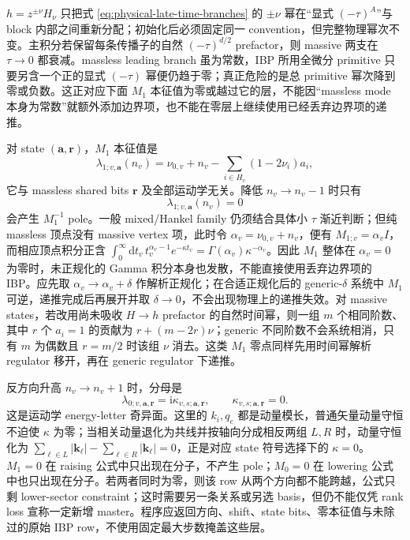 \documentclass[11pt,a4paper]{ctexart}
\newcommand{\dd}{\mathrm d}
\newcommand{\ii}{\mathrm i}
\begin{document}
$h=z^{\pm\nu}H_\nu$ 只把式 \eqref{eq:physical-late-time-branches} 的 $\pm\nu$ 幂在“显式 $(-\tau)^A$”与 block 内部之间重新分配；初始化后必须固定同一 convention，但完整物理幂次不变。主积分若保留每条传播子的自然 $(-\tau)^{d/2}$ prefactor，则 massive 两支在 $\tau\to0$ 都衰减。massless leading branch 虽为常数，IBP 所用全微分 primitive 只要另含一个正的显式 $(-\tau)$ 幂便仍趋于零；真正危险的是总 primitive 幂次降到零或负数。这正对应下面 $M_1$ 本征值为零或越过它的层，不能因“massless mode 本身为常数”就额外添加边界项，也不能在零层上继续使用已经丢弃边界项的递推。

对 state $(\bm a,\bm r)$，$M_1$ 本征值是
\begin{equation}
 \lambda_{1;v,\bm a}(n_v)
 =\nu_{0,v}+n_v
 -\sum_{i\in H_v}(1-2\nu_i)a_i,
 \label{eq:M1-general-eigenvalue}
\end{equation}
它与 massless shared bits $\bm r$ 及全部运动学无关。降低 $n_v\to n_v-1$ 时只有
\begin{equation}
 \lambda_{1;v,\bm a}(n_v)=0
 \label{eq:M1-lowering-resonance}
\end{equation}
会产生 $M_1^{-1}$ pole。一般 mixed/Hankel family 仍须结合具体小 $\tau$ 渐近判断；但纯 massless 顶点没有 massive vertex 项，此时令 $\alpha_v=\nu_{0,v}+n_v$，便有 $M_{1;v}=\alpha_v I$，而相应顶点积分正含 $\int_0^\infty\!\dd t_v\,t_v^{\alpha_v-1}e^{-\kappa t_v}=\Gamma(\alpha_v)\kappa^{-\alpha_v}$。因此 $M_1$ 整体在 $\alpha_v=0$ 为零时，未正规化的 Gamma 积分本身也发散，不能直接使用丢弃边界项的 IBP。应先取 $\alpha_v\to\alpha_v+\delta$ 作解析正规化；在合适正规化后的 generic-$\delta$ 系统中 $M_1$ 可逆，递推完成后再展开并取 $\delta\to0$，不会出现物理上的递推失效。对 massive states，若改用尚未吸收 $H\to h$ prefactor 的自然时间幂，则一组 $m$ 个相同阶数、其中 $r$ 个 $a_i=1$ 的贡献为 $r+(m-2r)\nu$；generic 不同阶数不会系统相消，只有 $m$ 为偶数且 $r=m/2$ 时该组 $\nu$ 消去。这类 $M_1$ 零点同样先用时间幂解析 regulator 移开，再在 generic regulator 下递推。

反方向升高 $n_v\to n_v+1$ 时，分母是
\begin{equation}
 \lambda_{0;v,\bm a,\bm r}
 =\ii\kappa_{v,s;\bm a,\bm r},
 \qquad
 \kappa_{v,s;\bm a,\bm r}=0.
 \label{eq:M0-raising-resonance}
\end{equation}
这是运动学 energy-letter 奇异面。这里的 $k_i,q_e$ 都是动量模长，普通矢量动量守恒不迫使 $\kappa$ 为零；当相关动量退化为共线并按轴向分成相反两组 $L,R$ 时，动量守恒化为 $\sum_{\ell\in L}|\bm k_\ell|-\sum_{\ell\in R}|\bm k_\ell|=0$，正是对应 state 符号选择下的 $\kappa=0$。$M_1=0$ 在 raising 公式中只出现在分子，不产生 pole；$M_0=0$ 在 lowering 公式中也只出现在分子。若两者同时为零，则该 row 从两个方向都不能跨越，公式只剩 lower-sector constraint；这时需要另一条关系或另选 basis，但仍不能仅凭 rank loss 宣称一定新增 master。程序应返回方向、shift、state bits、零本征值与未除过的原始 IBP row，不使用固定最大步数掩盖这些层。
\end{document}
